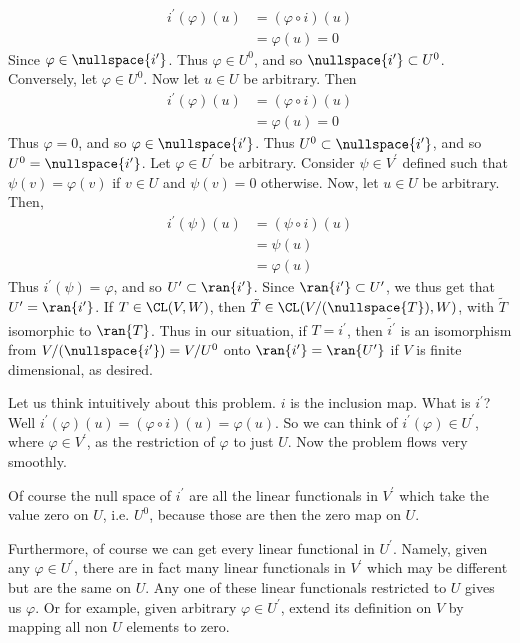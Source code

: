 \documentclass{book}
\begin{document}
\begin{enumerate}[label=\arabic*)]
\begin{enumerate}[label=\alph*)]
\begin{align*}
            i^{\prime}(\varphi)(u) & = (\varphi \circ i)(u) \\
            & = \varphi(u) = 0
          \end{align*}
          Since $\varphi \in \nullspace{i^{\prime}}$. Thus $\varphi \in U^0$, and so $\nullspace{i^{\prime}} \subset U^0$. Conversely, let $\varphi \in U^0$. Now let $u \in U$ be arbitrary. Then
          \begin{align*}
            i^{\prime}(\varphi)(u) & = (\varphi \circ i)(u) \\
            & = \varphi(u) = 0
          \end{align*}
          Thus $\varphi = 0$, and so $\varphi \in \nullspace{i^{\prime}}$. Thus $U^0 \subset \nullspace{i^{\prime}}$, and so $U^0 = \nullspace{i^{\prime}}$.
        \ii 
          Let $\varphi \in U^{\prime}$ be arbitrary. Consider $\psi \in V^{\prime}$ defined such that $\psi(v) = \varphi(v)$ if $v \in U$ and $\psi(v) = 0$ otherwise. Now, let $u \in U$ be
          arbitrary. Then,
          \begin{align*}
            i^{\prime}(\psi)(u) & = (\psi \circ i)(u) \\
            & = \psi(u) \\
            & = \varphi(u)
          \end{align*}
          Thus $i^{\prime}(\psi) = \varphi$, and so $U^{\prime} \subset \ran{i^{\prime}}$. Since $\ran{i^{\prime}} \subset U^{\prime}$, we thus get that $U^{\prime} = \ran{i^{\prime}}$.
        \ii 
          If $T \in \CL(V, W)$, then $\tilde{T} \in \CL(V/(\nullspace{T}), W)$, with $\tilde{T}$ isomorphic to $\ran{T}$. Thus in our situation, if $T = i^{\prime}$, then $\tilde{i^{\prime}}$
          is an isomorphism from $V/(\nullspace{i^{\prime}}) = V/U^0$ onto $\ran{i^{\prime}} = \ran{U^{\prime}}$ if $V$ is finite dimensional, as desired.
      \end{enumerate}
      Let us think intuitively about this problem. $i$ is the inclusion map. What is $i^{\prime}$? Well $i^{\prime}(\varphi)(u) = (\varphi \circ i)(u) = \varphi(u)$. So we can think of
      $i^{\prime}(\varphi) \in U^{\prime}$, where $\varphi \in V^{\prime}$, as the restriction of $\varphi$ to just $U$. Now the problem flows very smoothly. 

      Of course the null space of $i^{\prime}$ are all the linear functionals in $V^{\prime}$ which take the value zero on $U$, i.e. $U^0$, because those are then the zero map on $U$. 

      Furthermore, of course we can get every linear functional in $U^{\prime}$. Namely, given any $\varphi \in U^{\prime}$, there are in fact many linear functionals in $V^{\prime}$ which
      may be different but are the same on $U$. Any one of these linear functionals restricted to $U$ gives us $\varphi$. Or for example, given arbitrary $\varphi \in U^{\prime}$, extend its
      definition on $V$ by mapping all non $U$ elements to zero. 


\end{enumerate}
\end{document}
